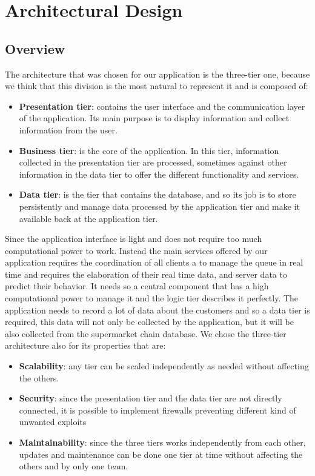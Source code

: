\chapter{Architectural Design}


\section{Overview}
The architecture that was chosen for our application is the three-tier one, because we think that this division is the most natural to represent it and is composed of:
\begin{itemize}
    \item \textbf{Presentation tier}: contains the user interface and the communication layer of the application. Its main purpose is to display information and collect information from the user.

    \item \textbf{Business tier}: is the core of the application. In this tier, information collected in the presentation tier are processed, sometimes against other information in the data tier to offer the different functionality and services.

    \item \textbf{Data tier}: is the tier that contains the database, and so its job is to store persistently and manage data processed by the application tier and make it available back at the application tier.
\end{itemize}
Since the application interface is light and does not require too much computational power to work.
Instead the main services offered by our application requires the coordination of all clients a to manage the queue in real time and requires the elaboration of their real time data, and server data to predict their behavior. It needs so a central component that has a high computational power to manage it and the logic tier describes it perfectly. The application needs to record a lot of data about the customers and so a data tier is required, this data will not only be collected by the application, but it will be also collected from the supermarket chain database.
We chose the three-tier architecture also for its properties that are:
\begin{itemize}
    \item \textbf{Scalability}: any tier can be scaled independently as needed without affecting the others.

    \item \textbf{Security}: since the presentation tier and the data tier are not directly connected, it is possible to implement firewalls preventing different kind of unwanted exploits

    \item \textbf{Maintainability}: since the three tiers works independently from each other, updates and maintenance can be done one tier at time without affecting the others and by only one team.
\end{itemize}
